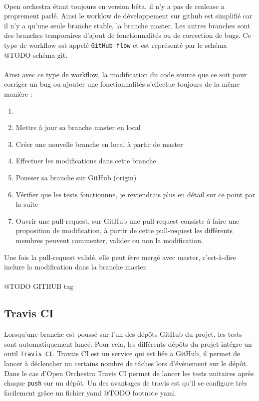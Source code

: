 \paragraph{}
Open orchestra étant toujours en version bêta, il n'y a pas de realease a proprement parlé. Ainsi le worklow de développement sur github est simplifié car il n'y a qu'une seule branche stable, la branche master. Les autres branches sont des branches temporaires d'ajout de fonctionnalités ou de correction de bugs. Ce type de workflow est appelé \verb?GitHub flow? et est représenté par le schéma @TODO schéma git.
\paragraph{}
Ainsi avec ce type de workflow, la modification du code source que ce soit pour corriger un bug ou ajouter une fonctionnalités s'effectue toujours de la même manière : 
\begin{enumerate}
\item[]
\item Mettre à jour sa branche master en local
\item Créer une nouvelle branche en local à partir de master
\item Effectuer les modifications dans cette branche
\item Pousser sa branche sur GitHub (origin)
\item Vérifier que les tests fonctionnne, je reviendrais plus en détail sur ce point par la suite
\item Ouvrir une pull-request, sur GitHub une pull-request consiste à faire une proposition de modification, à partir de cette pull-request les différents membres peuvent commenter, valider ou non la modification.
\end{enumerate}

Une fois la pull-request validé, elle peut être mergé avec master, c'est-à-dire inclure la modification dans la branche master.
\paragraph{}
@TODO  GITHUB tag
\subsection{Travis CI}
Lorsqu'une branche est poussé sur l'un des dépôts GitHub du projet, les tests sont automatiquement lancé. Pour cela, les différents dépôts du projet intégre un outil \verb?Travis CI?. Travais CI est un service qui est liée a GitHub, il permet de lancer à déclencher un certains nombre de tâches lors d'événement sur le dépôt. Dans le cas d'Open Orchestra Travis CI permet de lancer les tests unitaires après chaque \verb?push? sur un dépôt. Un des avantages de travis est qu'il se configure très facilement grâce un fichier yaml @TODO footnote yaml.
